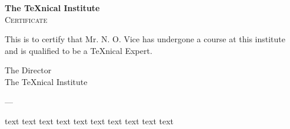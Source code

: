 \documentclass{article}
\begin{document}
\begin{center}
  {\bfseries\huge The \TeX nical Institute} \\[1cm]
  {\scshape\LARGE Certificate}
\end{center}

\noindent This is to certify that Mr. N. O. Vice has undergone a course at this institute and is qualified to be a \TeX nical Expert.

\begin{flushright}
  {\sffamily The Director \\
  The \TeX nical Institute}
\end{flushright}

---

{\tiny text}
{\scriptsize text} 
{\footnotesize text} 
{\footnotesize text} 
{\small text} 
{\normalsize text} 
{\large text} 
{\Large text} 
{\huge text} 
{\Huge text}
\end{document}
